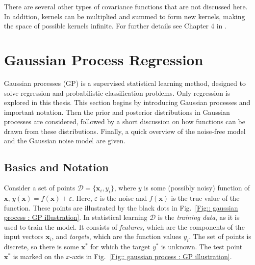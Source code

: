 \documentclass[twoside,english]{uiofysmaster}
\begin{document}
{{There are several other types of covariance functions that are not discussed here. In addition, kernels can be multiplied and summed to form new kernels, making the space of possible kernels infinite. For further details see Chapter 4 in \cite{rasmussen2006gaussian}.




\section{Gaussian Process Regression}\label{Sec: gaussian process : Gaussian Process Regression}

Gaussian processes (GP) is a supervised statistical learning method, designed to solve regression and probabilistic classification problems. Only regression is explored in this thesis. This section begins by introducing Gaussian processes and important notation. Then the prior and posterior distributions in Gaussian processes are considered, followed by a short discussion on how functions can be drawn from these distributions. Finally, a quick overview of the noise-free model and the Gaussian noise model are given.

\subsection{Basics and Notation}\label{Sec:: gaussian process : Basics and Notation}


Consider a set of points $\mathcal{D} = \{\textbf{x}_i, y_i\}$, where $y$ is some (possibly noisy) function of $\textbf{x}$, $y(\textbf{x}) = f(\textbf{x}) + \varepsilon$. Here, $\varepsilon$ is the noise and $f(\textbf{x})$ is the true value of the function. These points are illustrated by the black dots in Fig.~\ref{Fig:: gaussian process : GP illustration}. In statistical learning $\mathcal{D}$ is the \textit{training data}, as it is used to train the model. It consists of \textit{features}, which are the components of the input vectors $\textbf{x}_i$, and \textit{targets}, which are the function values $y_i$. The set of points is discrete, so there is some $\textbf{x}^*$ for which the target $y^*$ is unknown. The test point $\textbf{x}^*$ is marked on the $x$-axis in Fig.~\ref{Fig:: gaussian process : GP illustration}.

}}
\end{document}
